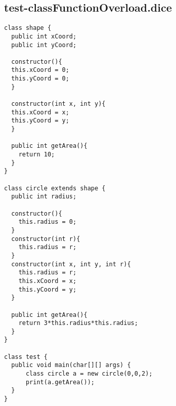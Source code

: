 \subsection{test-classFunctionOverload.dice}
\begin{verbatim}
class shape {
  public int xCoord;
  public int yCoord;

  constructor(){
  this.xCoord = 0;
  this.yCoord = 0;
  }

  constructor(int x, int y){
  this.xCoord = x;
  this.yCoord = y;
  }

  public int getArea(){
    return 10;
  }
}

class circle extends shape {
  public int radius;

  constructor(){
  	this.radius = 0;
  }
  constructor(int r){
  	this.radius = r;
  }
  constructor(int x, int y, int r){
  	this.radius = r;
  	this.xCoord = x;
  	this.yCoord = y;
  }

  public int getArea(){
    return 3*this.radius*this.radius;
  }
}

class test {
  public void main(char[][] args) {
      class circle a = new circle(0,0,2); 
      print(a.getArea());
  }
}
\end{verbatim}